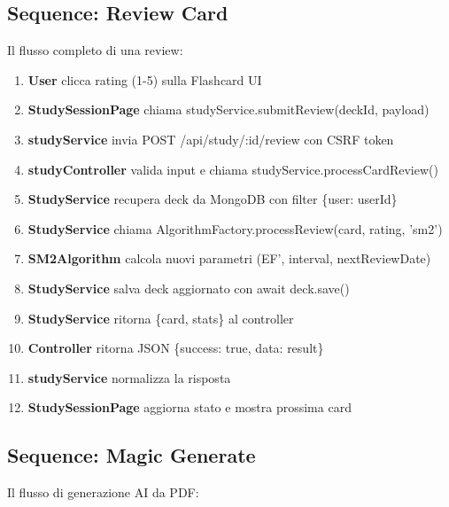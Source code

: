 \documentclass[11pt,a4paper]{article}
\begin{document}
\subsection{Sequence: Review Card}

Il flusso completo di una review:

\begin{enumerate}
    \item \textbf{User} clicca rating (1-5) sulla Flashcard UI
    \item \textbf{StudySessionPage} chiama studyService.submitReview(deckId, payload)
    \item \textbf{studyService} invia POST /api/study/:id/review con CSRF token
    \item \textbf{studyController} valida input e chiama studyService.processCardReview()
    \item \textbf{StudyService} recupera deck da MongoDB con filter \{user: userId\}
    \item \textbf{StudyService} chiama AlgorithmFactory.processReview(card, rating, 'sm2')
    \item \textbf{SM2Algorithm} calcola nuovi parametri (EF', interval, nextReviewDate)
    \item \textbf{StudyService} salva deck aggiornato con await deck.save()
    \item \textbf{StudyService} ritorna \{card, stats\} al controller
    \item \textbf{Controller} ritorna JSON \{success: true, data: result\}
    \item \textbf{studyService} normalizza la risposta
    \item \textbf{StudySessionPage} aggiorna stato e mostra prossima card
\end{enumerate}

\subsection{Sequence: Magic Generate}

Il flusso di generazione AI da PDF:
\end{document}
